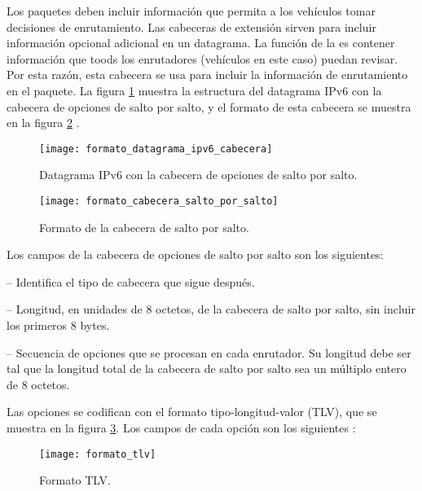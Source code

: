 \label{sec:cabecera_opciones}

Los paquetes deben incluir información que permita a los vehículos tomar
decisiones de enrutamiento. Las cabeceras de extensión sirven para incluir
información opcional adicional en un datagrama. La función de la
 es contener información que
toods los enrutadores (vehículos en este caso) puedan revisar. Por esta razón,
esta cabecera se usa para incluir la información de enrutamiento en el paquete.
La figura \ref{fig:formato_datagrama_ipv6_cabecera} muestra la estructura del
datagrama IPv6 con la cabecera de opciones de salto por salto, y el formato de
esta cabecera se muestra en la figura
\ref{fig:formato_cabecera_salto_por_salto} \cite{RFC2460}.

\begin{figure}[th!]
\centering
\texttt{[image: formato\_datagrama\_ipv6\_cabecera]} 
\decoRule
\caption[Datagrama IPv6 con la cabecera de opciones de salto por
salto]{Datagrama IPv6 con la cabecera de opciones de salto por salto.}
\label{fig:formato_datagrama_ipv6_cabecera}
\end{figure}

\begin{figure}[th!]
\centering
\texttt{[image: formato\_cabecera\_salto\_por\_salto]}
\decoRule
\caption[Formato de la cabecera de salto por salto]{Formato de la cabecera de
salto por salto.}
\label{fig:formato_cabecera_salto_por_salto}
\end{figure}

Los campos de la cabecera de opciones de salto por salto son los siguientes:

 -- Identifica el tipo de cabecera que
sigue después.

 -- Longitud, en unidades de 8
octetos, de la cabecera de salto por salto, sin incluir los primeros 8 bytes.

 -- Secuencia de opciones que se procesan
en cada enrutador. Su longitud debe ser tal que la longitud total de la
cabecera de salto por salto sea un múltiplo entero de 8 octetos.

Las opciones se codifican con el formato tipo-longitud-valor (TLV), que se
muestra en la figura \ref{fig:formato_tlv}. Los campos de cada opción son los
siguientes \cite{RFC2460}:

\begin{figure}[th!]
\centering
\texttt{[image: formato\_tlv]}
\decoRule
\caption[Formato TLV]{Formato TLV.}
\label{fig:formato_tlv}
\end{figure}

